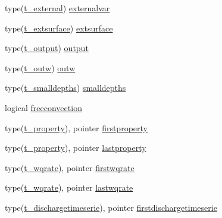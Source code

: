 \begin{DoxyCompactItemize}
\item 
type(\mbox{\hyperlink{structmodulewaterproperties_1_1t__external}{t\+\_\+external}}) \mbox{\hyperlink{structmodulewaterproperties_1_1t__waterproperties_a1f7fbcdf306cc734b8aa3fb9027a8691}{externalvar}}
\item 
type(\mbox{\hyperlink{structmodulewaterproperties_1_1t__extsurface}{t\+\_\+extsurface}}) \mbox{\hyperlink{structmodulewaterproperties_1_1t__waterproperties_a9be634f293c385eed744dc4b5fd8bef4}{extsurface}}
\item 
type(\mbox{\hyperlink{structmodulewaterproperties_1_1t__output}{t\+\_\+output}}) \mbox{\hyperlink{structmodulewaterproperties_1_1t__waterproperties_a59644a65855a2e8d068c302aeef3b988}{output}}
\item 
type(\mbox{\hyperlink{structmodulewaterproperties_1_1t__outw}{t\+\_\+outw}}) \mbox{\hyperlink{structmodulewaterproperties_1_1t__waterproperties_aae2951f9ae7317e57c1e324afede9013}{outw}}
\item 
type(\mbox{\hyperlink{structmodulewaterproperties_1_1t__smalldepths}{t\+\_\+smalldepths}}) \mbox{\hyperlink{structmodulewaterproperties_1_1t__waterproperties_a8f3f14296cf44bf9be62533637311867}{smalldepths}}
\item 
logical \mbox{\hyperlink{structmodulewaterproperties_1_1t__waterproperties_a5b2a995a4032339f48b7b936247b9d18}{freeconvection}}
\item 
type(\mbox{\hyperlink{structmodulewaterproperties_1_1t__property}{t\+\_\+property}}), pointer \mbox{\hyperlink{structmodulewaterproperties_1_1t__waterproperties_ae7ae8cb63c61f26b91837e279d7024e8}{firstproperty}}
\item 
type(\mbox{\hyperlink{structmodulewaterproperties_1_1t__property}{t\+\_\+property}}), pointer \mbox{\hyperlink{structmodulewaterproperties_1_1t__waterproperties_abd19b672c9d11946c6d500ed96567d23}{lastproperty}}
\item 
type(\mbox{\hyperlink{structmodulewaterproperties_1_1t__wqrate}{t\+\_\+wqrate}}), pointer \mbox{\hyperlink{structmodulewaterproperties_1_1t__waterproperties_af297a6efbfa450105ddba154f67c7bc8}{firstwqrate}}
\item 
type(\mbox{\hyperlink{structmodulewaterproperties_1_1t__wqrate}{t\+\_\+wqrate}}), pointer \mbox{\hyperlink{structmodulewaterproperties_1_1t__waterproperties_a64ab1ef44b7c358bf7c950dc3c623a57}{lastwqrate}}
\item 
type(\mbox{\hyperlink{structmodulewaterproperties_1_1t__dischargetimeserie}{t\+\_\+dischargetimeserie}}), pointer \mbox{\hyperlink{structmodulewaterproperties_1_1t__waterproperties_afcb3a9e0e6646a4ed89d7d5bfef69c6c}{firstdischargetimeserie}}

\end{DoxyCompactItemize}
